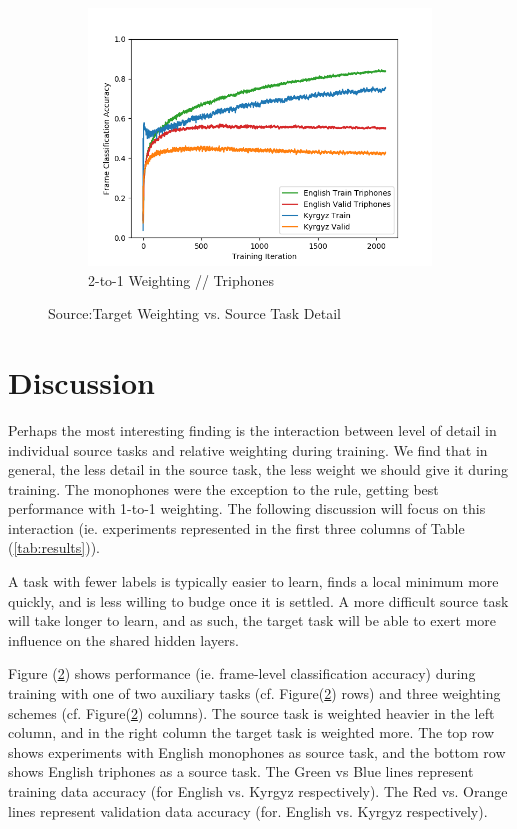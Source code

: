 \documentclass[a4paper]{article}
\begin{document}
\begin{figure}[!htbp]
\begin{subfigure}{.33\textwidth}
  \includegraphics[width=1\textwidth,keepaspectratio]{figs-1/1-to-2-tri.png}
  \caption{2-to-1 Weighting // Triphones}
  \label{fig:sub2}
\end{subfigure}
\caption{Source:Target Weighting vs. Source Task Detail}
\label{fig:1-to-2}
\end{figure}



\section{Discussion}

Perhaps the most interesting finding is the interaction between level of detail in individual source tasks and relative weighting during training. We find that in general, the less detail in the source task, the less weight we should give it during training. The monophones were the exception to the rule, getting best performance with 1-to-1 weighting. The following discussion will focus on this interaction (ie. experiments represented in the first three columns of Table (\ref{tab:results})). 

A task with fewer labels is typically easier to learn, finds a local minimum more quickly, and is less willing to budge once it is settled. A more difficult source task will take longer to learn, and as such, the target task will be able to exert more influence on the shared hidden layers.

Figure (\ref{fig:1-to-2}) shows performance (ie. frame-level classification accuracy) during training with one of two auxiliary tasks (cf. Figure(\ref{fig:1-to-2}) rows) and three weighting schemes (cf. Figure(\ref{fig:1-to-2}) columns). The source task is weighted heavier in the left column, and in the right column the target task is weighted more. The top row shows experiments with English monophones as source task, and the bottom row shows English triphones as a source task. The Green vs Blue lines represent training data accuracy (for English vs. Kyrgyz respectively). The Red vs. Orange lines represent validation data accuracy (for. English vs. Kyrgyz respectively).
\end{document}

